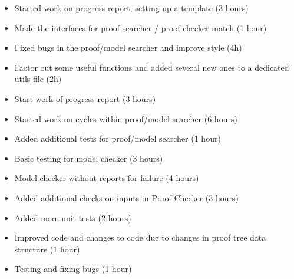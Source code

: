 %
{ \begin{itemize} 
 \item Started work on progress report, setting up a template (3 hours)
 \item Made the interfaces for proof searcher / proof checker match (1 hour)
 \item Fixed bugs in the proof/model searcher and improve style (4h)
 \item Factor out some useful functions and added several new ones to a
 dedicated utils file (2h)
 \end{itemize} 
}%
{ \begin{itemize} 
 \item Start work of progress report (3 hours)
 \item Started work on cycles within proof/model searcher (6 hours) 
 \item Added additional tests for proof/model searcher (1 hour)
 \end{itemize} 
}%
{ \begin{itemize} 
 \item Basic testing for model checker (3 hours)
 \item Model checker without reports for failure (4 hours)
 \end{itemize} 
}%
{ \begin{itemize} 
 \item Added additional checks on inputs in Proof Checker (3 hours)
 \item Added more unit tests (2 hours)
 \item Improved code and changes to code due to changes in proof tree data structure (1 hour)
 \item Testing and fixing bugs (1 hour)
 \end{itemize} 
}%

